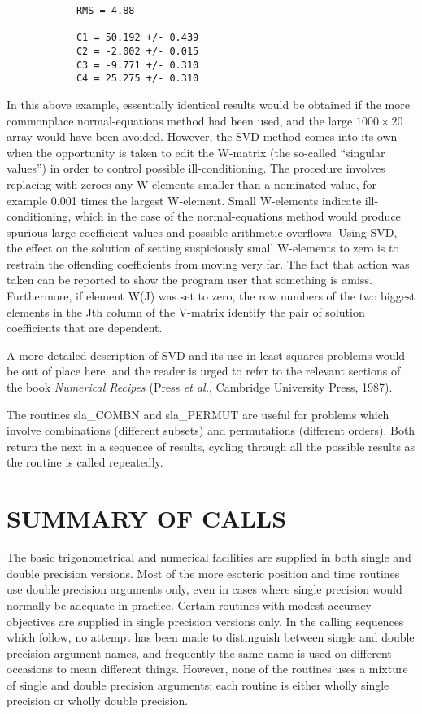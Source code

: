 \documentclass[11pt,twoside]{article}
\begin{document}
\goodbreak
\begin{verbatim}
            RMS = 4.88

            C1 = 50.192 +/- 0.439
            C2 = -2.002 +/- 0.015
            C3 = -9.771 +/- 0.310
            C4 = 25.275 +/- 0.310
\end{verbatim}
\goodbreak
In this above example, essentially
identical results would be obtained if the more
commonplace normal-equations method had been used, and the large
$1000\times20$ array would have been avoided.  However, the SVD method
comes into its own when the opportunity is taken to edit the W-matrix
(the so-called ``singular values'') in order to control
possible ill-conditioning.  The procedure involves replacing with
zeroes any W-elements smaller than a nominated value, for example
0.001 times the largest W-element.  Small W-elements indicate
ill-conditioning, which in the case of the normal-equations
method would produce spurious large coefficient values and
possible arithmetic overflows.  Using SVD, the effect on the solution
of setting suspiciously small W-elements to zero is to restrain
the offending coefficients from moving very far.  The
fact that action was taken can be reported to show the program user that
something is amiss.  Furthermore, if element W(J) was set to zero,
the row numbers of the two biggest elements in the Jth column of the
V-matrix identify the pair of solution coefficients that are
dependent.

A more detailed description of SVD and its use in least-squares
problems would be out of place here, and the reader is urged
to refer to the relevant sections of the book {\it Numerical Recipes}
(Press {\it et al.}, Cambridge University Press, 1987).

The routines
sla\_COMBN
and
sla\_PERMUT
are useful for problems which involve combinations (different subsets)
and permutations (different orders).
Both return the next in a sequence of results, cycling through all the
possible results as the routine is called repeatedly.

\vfill

\pagebreak

\section{SUMMARY OF CALLS}
The basic trigonometrical and numerical facilities are supplied in both single
and double precision versions.
Most of the more esoteric position and time routines use double precision
arguments only, even in cases where single precision would normally be adequate
in practice.
Certain routines with modest accuracy objectives are supplied in
single precision versions only.
In the calling sequences which follow, no attempt has been made
to distinguish between single and double precision argument names,
and frequently the same name is used on different occasions to
mean different things.
However, none of the routines uses a mixture of single and
double precision arguments;  each routine is either wholly
single precision or wholly double precision.
\end{document}
